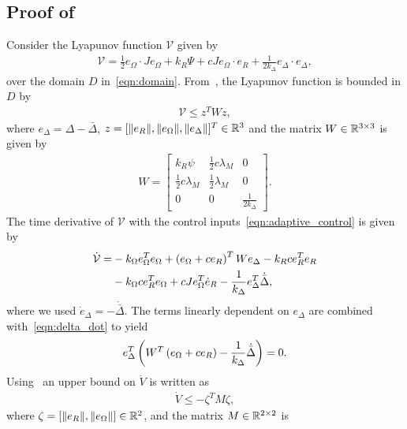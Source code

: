 \documentclass[letterpaper, 10 pt, conference]{ieeeconf}  %
\begin{document}
\subsection{Proof of~}\label{proof:adaptive_control}
	Consider the Lyapunov function \( \mathcal{V} \) given by
	\begin{gather}
		\mathcal{V} = \frac{1}{2} e_\Omega \cdot J e_\Omega + k_R \Psi + c J e_\Omega \cdot e_R + \frac{1}{2 k_\Delta} e_\Delta \cdot e_\Delta , \label{eqn:v_adapt}
	\end{gather}
	over the domain \( D \) in~\cref{eqn:domain}.
	From~, the Lyapunov function is bounded in \( D \) by
	\begin{gather}
		\mathcal{V} \leq z^T W z , \label{eqn:v_upper_bound}
	\end{gather}
	where \( e_\Delta = \Delta - \bar{\Delta} \), \( z = [\|e_R\|,\|e_\Omega\|,\|e_\Delta\|]^T\in\mathbb{R}^3 \) and the matrix \(W \in \mathbb{R}^{3 \times 3}\) is given by
	\begin{gather*}
		W = \begin{bmatrix}
			k_R \psi & \frac{1}{2} c \lambda_M & 0 \\
			\frac{1}{2} c \lambda_M & \frac{1}{2} \lambda_M & 0 \\
			0 & 0 & \frac{1}{2 k_\Delta}
		\end{bmatrix} .
	\end{gather*}
	The time derivative of \( \mathcal{V}\) with the control inputs~\cref{eqn:adaptive_control} is given by
	\begin{align}
		\dot{\mathcal{V}} =& - k_\Omega e_\Omega^T e_\Omega + \left( e_\Omega + c e_R \right)^T W e_\Delta - k_R c e_R^T e_R \nonumber\\
		&- k_\Omega c e_R^T e_\Omega + c J e_\Omega^T \dot{e}_R - \frac{1}{k_\Delta} e_\Delta^T \dot{\bar{\Delta}} , \label{eqn:vdot}
	\end{align}
	where we used \( \dot{e}_\Delta = - \dot{\bar{\Delta}} \).
	The terms linearly dependent on \( e_\Delta\) are combined with~\cref{eqn:delta_dot} to yield
	\begin{align*}
		 e_\Delta^T \left( W^T \left( e_\Omega + c e_R \right) - \frac{1}{k_\Delta} \dot{\bar{\Delta}} \right) = 0 . 
	\end{align*}
	Using~ an upper bound on \( \dot{V} \) is written as
	\begin{gather*}
		\dot{V} \leq -\zeta^T M \zeta ,
	\end{gather*}
	where $\zeta=[\|e_R\|,\|e_\Omega\|]\in\mathbb{R}^2$, and the matrix \( M \in \mathbb{R}^{2 \times 2} \) is 
\end{document}
